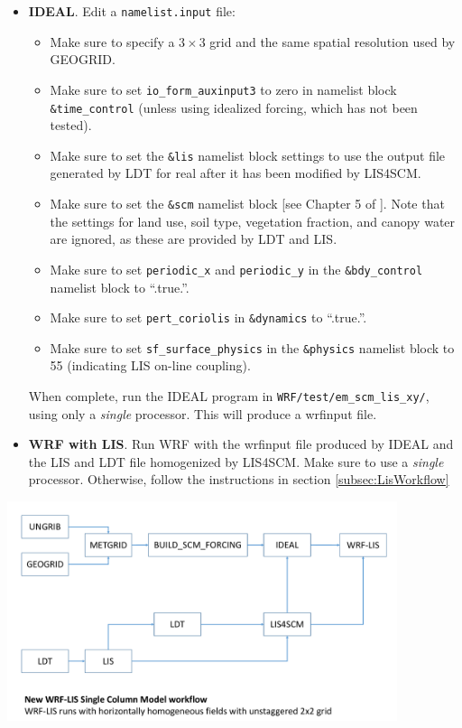 \begin{itemize}
\item \textbf{IDEAL}.  Edit a \texttt{namelist.input} file:  
  \begin{itemize}

    \item Make sure to specify a $3 \times 3$ grid and the same spatial 
      resolution used by GEOGRID.
    \item Make sure to set \texttt{io\_form\_auxinput3} to zero in namelist 
      block \texttt{\&time\_control} (unless using idealized forcing, which 
      has not been tested).  
    \item Make sure to set the \texttt{\&lis} namelist block settings to use 
      the output file generated by LDT for real after it has been modified by
      LIS4SCM.
    \item Make sure to set the \texttt{\&scm} namelist block [see Chapter 5 of
      \cite{ref:ArwUserGuide}].  Note that the settings for land use,
      soil type, vegetation fraction, and canopy water are ignored, as these 
      are provided by LDT and LIS.
    \item Make sure to set \texttt{periodic\_x} and \texttt{periodic\_y}
      in the \texttt{\&bdy\_control} namelist block to ``.true.''.
    \item Make sure to set \texttt{pert\_coriolis} in \texttt{\&dynamics} to
      ``.true.''.
    \item Make sure to set \texttt{sf\_surface\_physics} in the 
      \texttt{\&physics} namelist block to 55 (indicating LIS on-line 
      coupling).
  \end{itemize}

  When complete, run the IDEAL program in \texttt{WRF/test/em\_scm\_lis\_xy/},
  using only a \emph{single} processor.  This will produce a wrfinput file.

  \item \textbf{WRF with LIS}.  Run WRF with the wrfinput file produced by
    IDEAL and the LIS and LDT file homogenized by LIS4SCM.  Make sure to use
    a \emph{single} processor.  Otherwise, follow the instructions in section
    \ref{subsec:LisWorkflow}

\end{itemize}

\centerline{\includegraphics[width=4.5in]{wrf_scm_workflow}}

